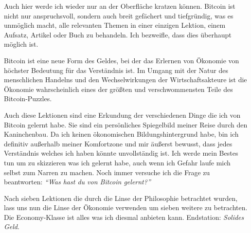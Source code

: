 Auch hier werde ich wieder nur an der Oberfläche kratzen können. Bitcoin ist
nicht nur anspruchsvoll, sondern auch breit gefächert und tiefgründig, was es
unmöglich macht, alle relevanten Themen in einer einzigen Lektion, einem
Aufsatz, Artikel oder Buch zu behandeln. Ich bezweifle, dass dies überhaupt
möglich ist.

Bitcoin ist eine neue Form des Geldes, bei der das Erlernen von Ökonomie von
höchster Bedeutung für das Verständnis ist. Im Umgang mit der Natur des
menschlichen Handelns und den Wechselwirkungen der Wirtschaftsakteure ist die
Ökonomie wahrscheinlich eines der größten und verschwommensten Teile des
Bitcoin-Puzzles.

Auch diese Lektionen sind eine Erkundung der verschiedenen Dinge die ich von
Bitcoin gelernt habe. Sie sind ein persönliches Spiegelbild meiner Reise durch
den Kaninchenbau. Da ich keinen ökonomischen Bildungshintergrund habe, bin ich
definitiv außerhalb meiner Komfortzone und mir äußerst bewusst, dass jedes
Verständnis welches ich haben könnte unvollständig ist. Ich werde mein Bestes
tun um zu skizzieren was ich gelernt habe, auch wenn ich Gefahr laufe mich
selbst zum Narren zu machen. Noch immer versuche ich die Frage zu beantworten:
\textit{\enquote{Was hast du von Bitcoin gelernt?}}

Nach sieben Lektionen die durch die Linse der Philosophie betrachtet wurden,
lass uns nun die Linse der Ökonomie verwenden um sieben weitere zu betrachten.
Die Economy-Klasse ist alles was ich diesmal anbieten kann. Endstation:
\textit{Solides Geld}.

